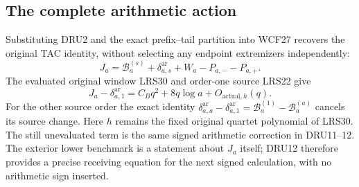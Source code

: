 \subsection{The complete arithmetic action}
Substituting DRU2 and the exact prefix--tail partition into WCF27
recovers the original TAC identity, without selecting any endpoint
extremizers independently:
\[
 J_a=\mathcal B_a^{(s)}+\delta_{a,s}^{\mathrm{ar}}
                          +W_a-P_{a,-}-P_{a,+}.
 \tag{DRU11}
\]
The evaluated original window LRS30 and order-one source LRS22 give
\[
 J_a-\delta_{a,1}^{\mathrm{ar}}
       =C_Bq^2+8q\log a+O_{\mathrm{actual},h}(q).
 \tag{DRU12}
\]
For the other source order the exact identity
$\delta_{a,a}^{\mathrm{ar}}-\delta_{a,1}^{\mathrm{ar}}
=\mathcal B_a^{(1)}-\mathcal B_a^{(a)}$ cancels its source change.
Here $h$ remains the fixed original quartet polynomial of LRS30.
The still unevaluated term is the same signed arithmetic correction
in DRU11--12.  The exterior lower benchmark is a statement about
$J_a$ itself; DRU12 therefore provides a precise receiving equation
for the next signed calculation, with no arithmetic sign inserted.
\endgroup

